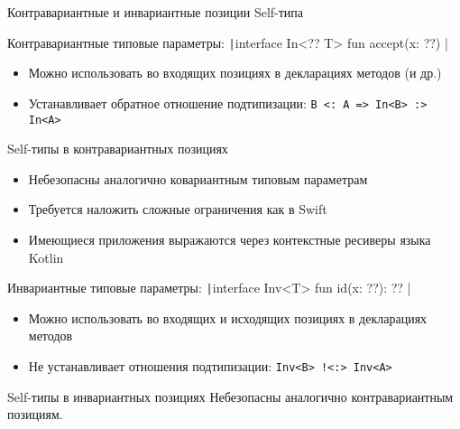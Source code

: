 \documentclass[aspectratio=169,usenames,dvipsnames]{beamer}
\begin{document}
    \begin{frame}{Контравариантные и инвариантные позиции Self-типа}
        \begin{block}{Контравариантные типовые параметры: \texttt|interface In<?? T> { fun accept(x: ??) }|}
            \begin{itemize}
                \item Можно использовать во входящих позициях в декларациях методов (и др.)
                \item Устанавливает обратное отношение подтипизации: \texttt{B <: A => In<B> :> In<A>}
            \end{itemize}
        \end{block}
        \pause
        \begin{block}{Self-типы в контравариантных позициях}
            \begin{itemize}
                \item Небезопасны аналогично ковариантным типовым параметрам
                \item Требуется наложить сложные ограничения как в Swift
                \item Имеющиеся приложения выражаются через контекстные ресиверы языка Kotlin
            \end{itemize}
        \end{block}
        \pause
        \begin{block}{Инвариантные типовые параметры: \texttt|interface Inv<T> { fun id(x: ??): ?? }|}
            \begin{itemize}
                \item Можно использовать во входящих и исходящих позициях в декларациях методов
                \item Не устанавливает отношения подтипизации: \texttt{Inv<B> !<:> Inv<A>}
            \end{itemize}
        \end{block}
        \pause
        \begin{block}{Self-типы в инвариантных позициях}
            Небезопасны аналогично контравариантным позициям.
        \end{block}
    \end{frame}
\end{document}
